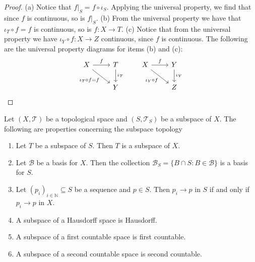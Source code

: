 \begin{proof}
  (a) Notice that \(f|_S = f \circ \iota_S\). Applying the universal property,
  we find that since \(f\) is continuous, so is \(f|_S\). (b) From the universal
  property we have that \(\iota_T \circ f = f\) is continuous, so is \(f: X \to
  T\). (c) Notice that from the universal property we have \(\iota_Y \circ f: X
  \to Z\) continuous, since \(f\) is continuous. The following are the universal
  property diagrams for items (b) and (c):
  \[
    \begin{tikzcd}
      X \rar["f"] \ar[rd, swap, "\iota_T \circ f = f"] &T \dar["\iota_T"] \\ &Y
    \end{tikzcd}
    \qquad
    \begin{tikzcd}
      X \rar["f"] \ar[rd, swap, "\iota_Y \circ f"] &Y \dar["\iota_Y"] \\ &Z
    \end{tikzcd}
  \]
\end{proof}

\begin{proposition}\label{prop: subspace properties}
  Let \((X, \mathcal T)\) be a topological space and \((S, \mathcal T_S)\) be a
  subspace of \(X\). The following are properties concerning the subspace
  topology
  \begin{enumerate}[(SP1)]
    \item\label{prop: subspace transitivity}
      Let \(T\) be a subspace of \(S\). Then \(T\) is a subspace of \(X\).  \item\label{prop: basis for subspace} Let \(\mathcal B\) be a basis for \(X\). Then the collection \(\mathcal B_S = \{B \cap S : B \in \mathcal B\}\) is a basis for \(S\).
    \item\label{prop: convergence subspace}
      Let \((p_i)_{i \in \mathbb{N}} \subseteq S\) be a sequence and \(p \in
      S\). Then \(p_i \to p\) in \(S\) if and only if \(p_i \to p\) in \(X\).
    \item\label{prop: Hausdorff implies Hausdorff subspace}
      A subspace of a Hausdorff space is Hausdorff.
    \item\label{prop: firs count implies first count subspace}
      A subspace of a first countable space is first countable.
    \item\label{prop: sec count implies sec count subspace}
      A subspace of a second countable space is second countable.
  \end{enumerate}
\end{proposition}

